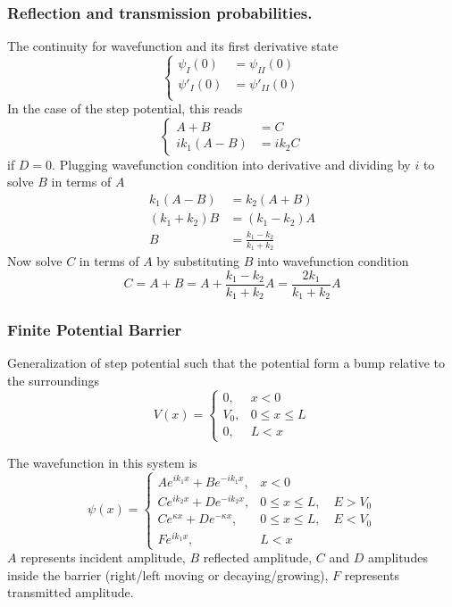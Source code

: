\documentclass[../../../main.tex]{subfiles}
\begin{document}
\subsubsection{Reflection and transmission probabilities.}
The continuity for wavefunction and its first derivative state
\begin{equation*}
  \begin{cases}
    \psi_I(0)  & =\psi_{II}(0)  \\
    \psi'_I(0) & =\psi'_{II}(0) \\
  \end{cases}
\end{equation*}
In the case of the step potential, this reads
\begin{equation*}
  \begin{cases}
    A+B       & =C       \\
    ik_1(A-B) & =  ik_2C
  \end{cases}
\end{equation*}
if $D=0$.
Plugging wavefunction condition into derivative and dividing by $i$ to solve $B$ in  terms of $A$
\begin{align*}
  k_1(A-B)      & =  k_2(A+B)                 \\
  (k_1 + k_2) B & =  (k_1 - k_2) A            \\
  B             & =  \frac{k_1-k_2 }{k_1+k_2}
\end{align*}
Now solve $C$ in terms of $A$ by substituting $B$ into wavefunction condition
\begin{equation*}
  C = A + B = A + \frac{k_1 - k_2}{k_1 + k_2} A = \frac{2 k_1}{k_1 + k_2} A
\end{equation*}

\subsubsection{Finite Potential Barrier}
Generalization of step potential such that the potential form a bump relative to the surroundings
\begin{equation*}
  V(x) =
  \begin{cases}
    0,   & x < 0         \\
    V_0, & 0 \le x \le L \\
    0,   & L < x
  \end{cases}
\end{equation*}

The wavefunction in this system is
\begin{equation*}
  \psi(x) =
  \begin{cases}
    A e^{i k_1 x} + B e^{-i k_1 x},   & x < 0                        \\[1mm]
    C e^{i k_2 x} + D e^{-i k_2 x},   & 0 \le x \le L, \quad E > V_0 \\[1mm]
    C e^{\kappa x} + D e^{-\kappa x}, & 0 \le x \le L, \quad E < V_0 \\[1mm]
    F e^{i k_1 x},                    & L<x
  \end{cases}
\end{equation*}
$A$ represents incident amplitude, $B$ reflected amplitude, $C$ and $D$ amplitudes inside the barrier (right/left moving or decaying/growing), $F$ represents transmitted amplitude.
\end{document}
